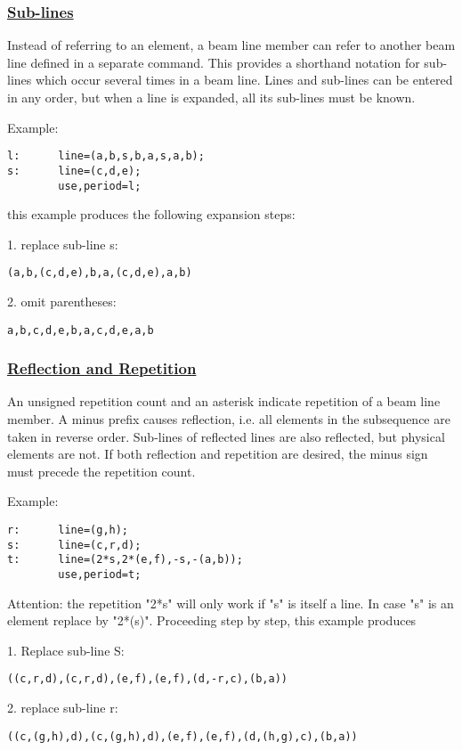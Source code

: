 \subsubsection{\href{subline}{Sub-lines}} 
Instead of referring to an element, a beam line member can refer to
another beam line defined in a separate command. This provides a
shorthand notation for sub-lines which occur several times in a beam
line. Lines and sub-lines can be entered in any order, but when a line
is expanded, all its sub-lines must be known.  

Example: 
\begin{verbatim}
l:      line=(a,b,s,b,a,s,a,b);
s:      line=(c,d,e);
        use,period=l;
\end{verbatim} 
this example produces the following expansion steps: 

1. replace sub-line s: 
\begin{verbatim}
(a,b,(c,d,e),b,a,(c,d,e),a,b)
\end{verbatim}

2. omit parentheses: 
\begin{verbatim}
a,b,c,d,e,b,a,c,d,e,a,b
\end{verbatim}

\subsubsection{\href{reflect}{Reflection and Repetition}} 
An unsigned repetition count and an asterisk indicate repetition of a
beam line member. A minus prefix causes reflection, i.e. all elements in
the subsequence are taken in reverse order. Sub-lines of reflected lines
are also reflected, but physical elements are not. If both reflection
and repetition are desired, the minus sign must precede the repetition
count.  

Example: 
\begin{verbatim}
r:      line=(g,h);
s:      line=(c,r,d);
t:      line=(2*s,2*(e,f),-s,-(a,b));
        use,period=t;
\end{verbatim}
Attention: the repetition "2*s" will only work if
"s" is itself a line. In case "s" is an element replace by
"2*(s)".  Proceeding step by step, this example produces 

1. Replace sub-line S: 
\begin{verbatim}
((c,r,d),(c,r,d),(e,f),(e,f),(d,-r,c),(b,a))
\end{verbatim}

2. replace sub-line r: 
\begin{verbatim}
((c,(g,h),d),(c,(g,h),d),(e,f),(e,f),(d,(h,g),c),(b,a))
\end{verbatim}

